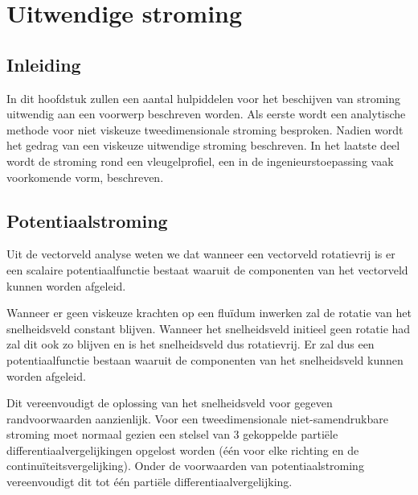 \chapter{Uitwendige stroming}
\label{sec:Uitwendige stroming}

	\section{Inleiding}
	\label{sec:Uitwendige stroming Inleiding}
In dit hoofdstuk zullen een aantal hulpiddelen voor het beschijven van stroming uitwendig aan een voorwerp beschreven worden. Als eerste wordt een analytische methode voor niet viskeuze tweedimensionale stroming besproken. Nadien wordt het gedrag van een viskeuze uitwendige stroming beschreven. In het laatste deel wordt de stroming rond een vleugelprofiel, een in de ingenieurstoepassing vaak voorkomende vorm, beschreven.

	\section{Potentiaalstroming}
	\label{sec:Potentiaalstroming}

Uit de vectorveld analyse weten we dat wanneer een vectorveld rotatievrij is er een scalaire potentiaalfunctie bestaat waaruit de componenten van het vectorveld kunnen worden afgeleid.

Wanneer er geen viskeuze krachten op een fluïdum inwerken zal de rotatie van het snelheidsveld constant blijven. Wanneer het snelheidsveld initieel geen rotatie had zal dit ook zo blijven en is het snelheidsveld dus rotatievrij. Er zal dus een potentiaalfunctie bestaan waaruit de componenten van het snelheidsveld kunnen worden afgeleid.

Dit vereenvoudigt de oplossing van het snelheidsveld voor gegeven randvoorwaarden aanzienlijk. Voor een tweedimensionale niet-samendrukbare stroming moet normaal gezien een stelsel van 3 gekoppelde partiële differentiaalvergelijkingen opgelost worden (één voor elke richting en de continuïteitsvergelijking). Onder de voorwaarden van potentiaalstroming vereenvoudigt dit tot één partiële differentiaalvergelijking.
